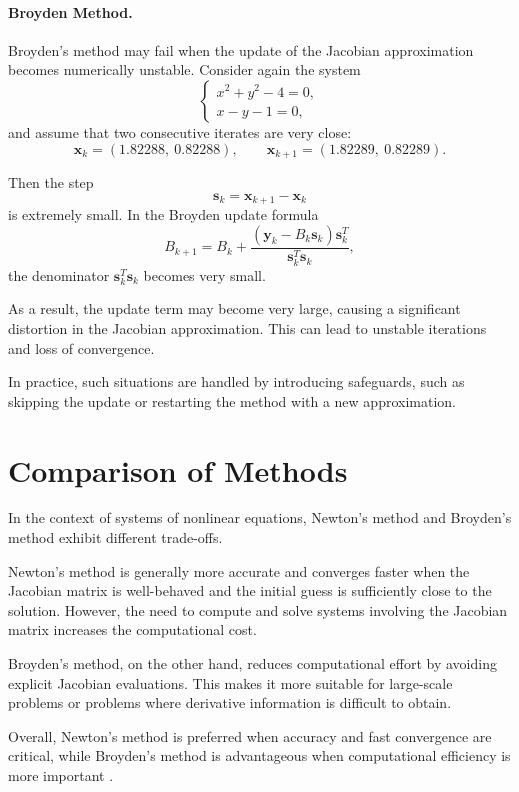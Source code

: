 \paragraph{Broyden Method.}
Broyden's method may fail when the update of the Jacobian approximation becomes numerically unstable. Consider again the system
\begin{equation}
\begin{cases}
x^2 + y^2 - 4 = 0, \\
x - y - 1 = 0,
\end{cases}
\end{equation}
and assume that two consecutive iterates are very close:
\[
\mathbf{x}_k = (1.82288,\ 0.82288), \qquad
\mathbf{x}_{k+1} = (1.82289,\ 0.82289).
\]

Then the step
\[
\mathbf{s}_k = \mathbf{x}_{k+1} - \mathbf{x}_k
\]
is extremely small. In the Broyden update formula
\[
B_{k+1} = B_k + \frac{(\mathbf{y}_k - B_k \mathbf{s}_k)\mathbf{s}_k^T}{\mathbf{s}_k^T \mathbf{s}_k},
\]
the denominator \( \mathbf{s}_k^T \mathbf{s}_k \) becomes very small.

As a result, the update term may become very large, causing a significant distortion in the Jacobian approximation. This can lead to unstable iterations and loss of convergence.

In practice, such situations are handled by introducing safeguards, such as skipping the update or restarting the method with a new approximation.

\section{Comparison of Methods}

In the context of systems of nonlinear equations, Newton's method and Broyden's method exhibit different trade-offs.

Newton's method is generally more accurate and converges faster when the Jacobian matrix is well-behaved and the initial guess is sufficiently close to the solution. However, the need to compute and solve systems involving the Jacobian matrix increases the computational cost.

Broyden's method, on the other hand, reduces computational effort by avoiding explicit Jacobian evaluations. This makes it more suitable for large-scale problems or problems where derivative information is difficult to obtain.

Overall, Newton's method is preferred when accuracy and fast convergence are critical, while Broyden's method is advantageous when computational efficiency is more important \cite{kelley, chapra}.